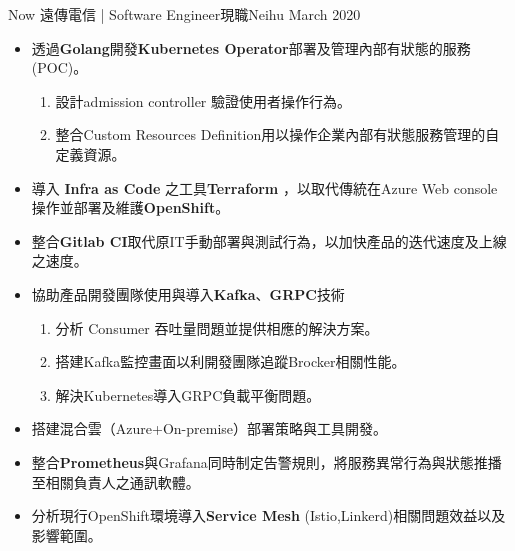 %
%
%
\begin{experiences}
  \experience
    {Now}   {遠傳電信 | Software Engineer}{現職}{Neihu}
    {March 2020} {
                      \begin{itemize}
                        \item 透過\textbf{Golang}開發\textbf{Kubernetes Operator}部署及管理內部有狀態的服務 (POC)。
                        \begin{enumerate}
                        	\item 設計admission controller 驗證使用者操作行為。
                            \item 整合Custom Resources Definition用以操作企業內部有狀態服務管理的自定義資源。
                        \end{enumerate}
                        \item 導入 \textbf{Infra as Code} 之工具\textbf{Terraform} ，以取代傳統在Azure Web console 操作並部署及維護\textbf{OpenShift}。           
                        \item 整合\textbf{Gitlab CI}取代原IT手動部署與測試行為，以加快產品的迭代速度及上線之速度。                
                        \item 協助產品開發團隊使用與導入\textbf{Kafka}、\textbf{GRPC}技術
                        \begin{enumerate}
                        	\item 分析 Consumer 吞吐量問題並提供相應的解決方案。
                            \item 搭建Kafka監控畫面以利開發團隊追蹤Brocker相關性能。
                            \item 解決Kubernetes導入GRPC負載平衡問題。
                        \end{enumerate}
                        \item 搭建混合雲（Azure+On-premise）部署策略與工具開發。
                        \item 整合\textbf{Prometheus}與Grafana同時制定告警規則，將服務異常行為與狀態推播至相關負責人之通訊軟體。
                        \item 分析現行OpenShift環境導入\textbf{Service Mesh} (Istio,Linkerd)相關問題效益以及影響範圍。
                        

\end{itemize}}
\end{experiences}
